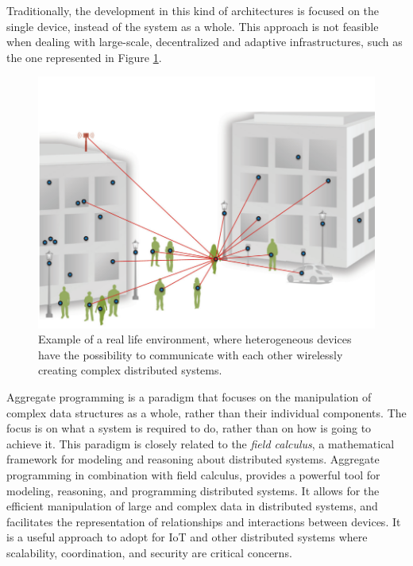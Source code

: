 Traditionally, the development in this kind of architectures is focused on the single device, instead of the system as a whole. This approach is not feasible when dealing with large-scale, decentralized and adaptive infrastructures, such as the one represented in Figure \ref{fig:iot_connected_things}.

\begin{figure}[!ht]
    \centering
    \includegraphics[scale=0.8]{document/chapters/1-introduction/images/iot_connected_things.png}
    \caption{Example of a real life environment, where heterogeneous devices have the possibility to communicate with each other wirelessly creating complex distributed systems. \cite{aggregate_programmig_iot}}
    \label{fig:iot_connected_things}
\end{figure}

Aggregate programming is a paradigm that focuses on the manipulation of complex data structures as a whole, rather than their individual components. The focus is on what a system is required to do, rather than on how is going to achieve it.\newline
This paradigm is closely related to the \textit{field calculus}, a mathematical framework for modeling and reasoning about distributed systems.\newline
Aggregate programming in combination with field calculus, provides a powerful tool for modeling, reasoning, and programming distributed systems. It allows for the efficient manipulation of large and complex data in distributed systems, and facilitates the representation of relationships and interactions between devices. It is a useful approach to adopt for IoT and other distributed systems where scalability, coordination, and security are critical concerns.

